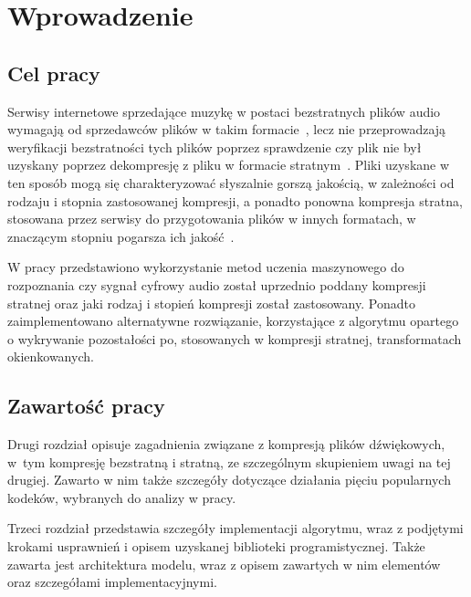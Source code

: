 \documentclass[pl,12pt]{aghdpl}
\author{Szymon Piotr Mikulicz}
\date{\today}
\let\Oldchapter\chapter%
\renewcommand{\chapter}{\FloatBarrier\Oldchapter}
\let\Oldsection\section%
\renewcommand{\section}{\FloatBarrier\Oldsection}
\begin{document}
\titlepages

{%
        \fancyhf{}
        \renewcommand{\headrulewidth}{0pt}
        \renewcommand{\footrulewidth}{0pt}
}

\setcounter{tocdepth}{2}
{\singlespacing\tableofcontents}
\clearpage

\chapter{Wprowadzenie}
\section{Cel pracy}
Serwisy internetowe sprzedające muzykę w postaci bezstratnych plików audio
wymagają od sprzedawców plików w takim formacie~\cite{BCWhyLossless}, lecz nie
przeprowadzają weryfikacji bezstratności tych plików poprzez sprawdzenie czy
plik nie był uzyskany poprzez dekompresję z pliku w formacie
stratnym~\cite{ZhouWangJinYan2015}. Pliki uzyskane w ten sposób mogą się
charakteryzować słyszalnie gorszą jakością, w zależności od rodzaju i stopnia
zastosowanej kompresji, a ponadto ponowna kompresja stratna, stosowana przez
serwisy do przygotowania plików w innych formatach, w znaczącym stopniu
pogarsza ich jakość~\cite{YangShiHuang2010}.

W pracy przedstawiono wykorzystanie metod uczenia maszynowego do rozpoznania
czy sygnał cyfrowy audio został uprzednio poddany kompresji stratnej oraz jaki
rodzaj i stopień kompresji został zastosowany. Ponadto zaimplementowano
alternatywne rozwiązanie, korzystające z algorytmu opartego o wykrywanie
pozostałości po, stosowanych w kompresji stratnej, transformatach okienkowanych.

\section{Zawartość pracy}
Drugi rozdział opisuje zagadnienia związane z kompresją plików dźwiękowych,
w~tym kompresję bezstratną i stratną, ze szczególnym skupieniem uwagi na tej
drugiej. Zawarto w nim także szczegóły dotyczące działania pięciu
popularnych kodeków, wybranych do analizy w pracy.

Trzeci rozdział przedstawia szczegóły implementacji algorytmu, wraz z podjętymi
krokami usprawnień i opisem uzyskanej biblioteki programistycznej. Także
zawarta jest architektura modelu, wraz z opisem zawartych w nim elementów oraz
szczegółami implementacyjnymi.
\end{document}
